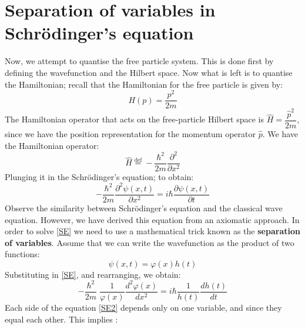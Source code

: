   \section{Separation of variables in Schr\"{o}dinger's equation}
  Now, we attempt to quantise the free particle system. This is done first by defining the wavefunction and the Hilbert space. Now what is left is to quantise the Hamiltonian; recall that the Hamiltonian for the free particle is given by:
  \begin{equation}
  H (p)= \dfrac{p^2}{2m}
  \end{equation}
  The Hamiltonian operator that acts on the free-particle Hilbert space is $ \hat{H} = \dfrac{\hat{p}^2}{2m}$, since we have the position representation for the momentum operator $ \hat{p}$. We have the Hamiltonian operator:
  \begin{equation}
  \hat{H} \overset{\text{def}}{=}- \frac{\hbar ^2}{2 m} \dfrac{\partial ^2}{\partial x^2}
  \end{equation}
  Plunging it in the Schr\"{o}dinger's equation; to obtain:\marginpar{}
  \begin{equation}
  - \frac{\hbar ^2}{2 m} \dfrac{\partial ^2 \psi (x,t)}{\partial x^2}= i \hbar \dfrac{\partial \psi(x,t)}{\partial t }
  \label{SE}
  \end{equation}
 Observe the similarity between Schr\"{o}dinger's equation and the classical wave equation. However, we have derived this equation from an axiomatic approach. In order to solve \eqref{SE} we need to use a mathematical trick known as the\textbf{ separation of variables}. Assume that we can write the wavefunction as the product of two functions:
  \begin{equation}
  \psi(x,t) = \varphi (x) h(t)
  \end{equation}
  Substituting in \eqref{SE}, and rearranging, we obtain:
  \begin{equation}
  - \frac{\hbar ^2}{2 m }\; \frac{1}{\varphi(x)} \dfrac{d^2 \varphi{(x)}}{dx^2} = i \hbar \frac{1}{h(t)} \frac{d h(t)}{dt}
  \label{SE2}
  \end{equation}
  Each side of the equation \eqref{SE2} depends only on one variable, and since they equal each other. This implies :
  
